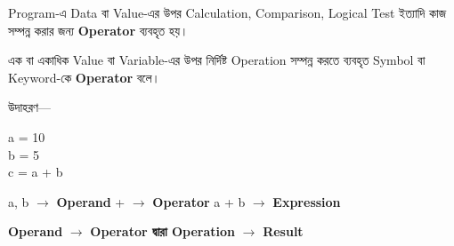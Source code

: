 
Program-এ Data বা Value-এর উপর Calculation, Comparison,
Logical Test ইত্যাদি কাজ সম্পন্ন করার জন্য
\textbf{Operator} ব্যবহৃত হয়।



\begin{definitionbox}

এক বা একাধিক Value বা Variable-এর উপর নির্দিষ্ট Operation
সম্পন্ন করতে ব্যবহৃত Symbol বা Keyword-কে
\textbf{Operator} বলে।

\end{definitionbox}

উদাহরণ—

\begin{codebox}
\begin{english}
\ttfamily
a = 10\\
b = 5\\
c = a + b
\end{english}
\end{codebox}

\begin{center}

\textenglish{\ttfamily a, b}
\(\longrightarrow\)
\textbf{Operand}
\qquad
\textenglish{\ttfamily +}
\(\longrightarrow\)
\textbf{Operator}
\qquad
\textenglish{\ttfamily a + b}
\(\longrightarrow\)
\textbf{Expression}

\end{center}

\begin{rememberbox}
\begin{center}
\textbf{Operand}
\(\longrightarrow\)
\textbf{Operator দ্বারা Operation}
\(\longrightarrow\)
\textbf{Result}
\end{center}
\end{rememberbox}



